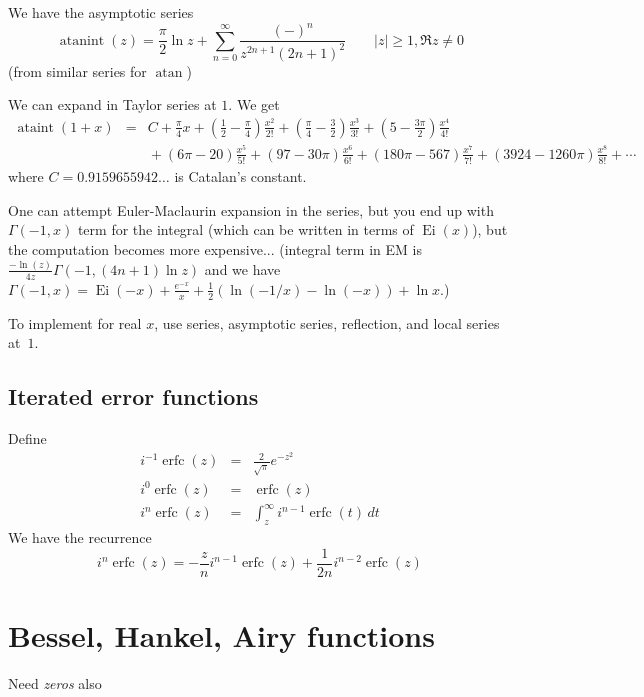 \documentclass[10pt,dvipdfmx,letterpaper,twoside]{article}
\DeclareMathOperator{\erfc}{erfc}
\DeclareMathOperator{\atan}{atan}
\let\O=\operatorname
\newenvironment{implementation}{\noindent\begin{framed}}{\end{framed}}
\let\Gam=\Gamma
\begin{document}
We have the asymptotic series
\[ \O{atanint}(z) = \frac\pi2\ln z + \sum_{n=0}^\infty \frac{(-)^n}{z^{2n+1}(2n+1)^2} \qquad|z|\geq1, \Re z\neq0\]
(from similar series for $\atan$)

We can expand in Taylor series at $1$.  We get
\begin{eqnarray*}
  \O{ataint}(1+x) &=& C + \frac\pi4 x + \left(\frac12-\frac\pi4\right) \frac{x^2}{2!} + \left(\frac\pi4-\frac32\right) \frac{x^3}{3!} + \left(5-\frac{3\pi}2\right) \frac{x^4}{4!} \\
      && {} + \left(6\pi-20\right) \frac{x^5}{5!} + \left(97-30\pi\right) \frac{x^6}{6!} + \left(180\pi-567\right) \frac{x^7}{7!} + \left(3924-1260\pi\right) \frac{x^8}{8!} + \cdots
\end{eqnarray*}
where $C=0.9159655942\dots$ is Catalan's constant.

One can attempt Euler-Maclaurin expansion in the series, but you end up with $\Gam(-1,x)$ term for the integral (which can be written in terms of $\O{Ei}(x)$), but the
computation becomes more expensive... (integral term in EM is $\tfrac{-\ln(z)}{4z}\Gam(-1, (4n+1)\ln z)$
and we have $\Gam(-1,x) = \O{Ei}(-x) + \frac{e^{-x}}{x} + \frac12(\ln(-1/x) - \ln(-x)) + \ln x$.)

\begin{implementation}
To implement for real $x$, use series, asymptotic series, reflection, and local series at~$1$.
\end{implementation}


\subsection{Iterated error functions}
Define
\begin{eqnarray*}
i^{-1}\erfc(z) &=& \frac{2}{\sqrt\pi} e^{-z^2} \\
i^{0}\erfc(z) &=& \erfc(z) \\
i^{n}\erfc(z) &=& \int_z^\infty i^{n-1}\erfc(t)\,dt
\end{eqnarray*}
We have the recurrence
\[ i^{n}\erfc(z) = -\frac{z}{n}i^{n-1}\erfc(z) + \frac{1}{2n}i^{n-2}\erfc(z) \]

\section{Bessel, Hankel, Airy functions}

Need {\em zeros} also
\end{document}
